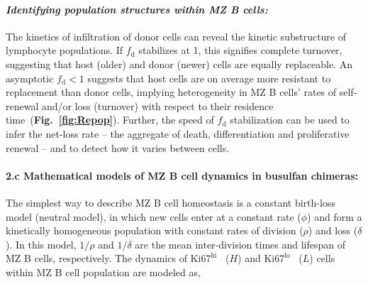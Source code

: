 \documentclass[11pt]{article}
\newcommand{\khi}{\ensuremath{\text{Ki67}^\text{hi}}~}
\newcommand{\klo}{\ensuremath{\text{Ki67}^\text{lo}}~}
\newcommand{\para}[1]{\vspace*{-4.5mm}\paragraph{#1}}
\begin{document}
\para{\textit{Identifying population structures within MZ B cells:}}
The kinetics of infiltration of donor cells can reveal the kinetic substructure of lymphocyte populations.
If $f_\text{d}$ stabilizes at 1, this signifies complete turnover, suggesting that host (older) and donor (newer) cells are equally replaceable.
An asymptotic $f_\text{d}<1$ suggests that host cells are on average more resistant to replacement than donor cells,  implying heterogeneity in MZ B cells' rates of self-renewal and/or loss (turnover) with respect to their residence time~(\textbf{Fig.~\ref{fig:Repop}}).
Further, the speed of $f_\text{d}$ stabilization can be used to infer the net-loss rate -- the aggregate of death, differentiation and proliferative renewal -- and to detect how it varies between cells.


\para{{2.c Mathematical models of  MZ B cell dynamics in busulfan chimeras:}} \label{sec:buchi_models}
The simplest way to describe MZ B cell homeostasis is a constant birth-loss model (neutral model), in which new cells enter at a constant rate ($\phi$) and form a kinetically homogeneous population with constant rates of division ($\rho$) and loss ($\delta$).
In this model, $1/\rho$ and $1/\delta$ are the mean inter-division times and lifespan of MZ B cells, respectively.
The dynamics of {\khi} ($H$) and {\klo} ($L$) cells within MZ B cell population are modeled as, 
\end{document}
